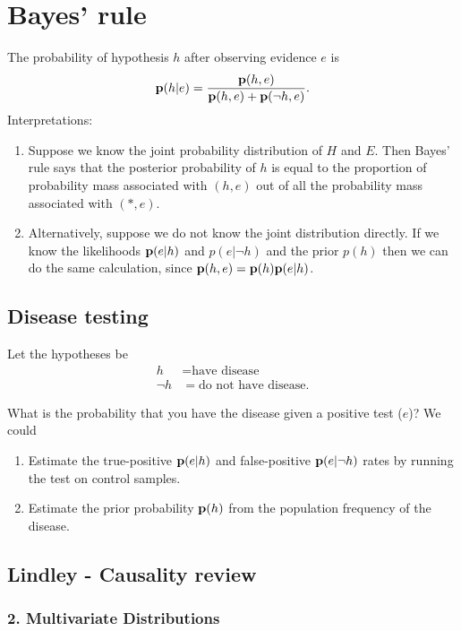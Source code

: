 \section{Bayes' rule}

The probability of hypothesis $h$ after observing evidence $e$ is
\begin{align*}
  \mathbf{p}(h | e)
  = \frac{\mathbf{p}(h, e)}{\mathbf{p}(h, e) + \mathbf{p}(\neg h, e)}.
\end{align*}
Interpretations:
\begin{enumerate}
\item Suppose we know the joint probability distribution of $H$ and $E$. Then Bayes' rule says that the posterior
  probability of $h$ is equal to the proportion of probability mass associated with $(h, e)$ out of all the
  probability mass associated with $(*, e)$.

\item Alternatively, suppose we do not know the joint distribution directly. If we know the likelihoods
  $\mathbf{p}(e|h)$ and $p(e|\neg h)$ and the prior $p(h)$ then we can do the same calculation, since $\mathbf{p}(h, e) = \mathbf{p}(h)\mathbf{p}(e | h)$.
\end{enumerate}

\subsection{Disease testing}

Let the hypotheses be
\begin{align*}
  h      &= \text{have disease} \\
  \neg h &= \text{do not have disease}.
\end{align*}

What is the probability that you have the disease given a positive test ($e$)? We could
\begin{enumerate}
\item Estimate the true-positive $\mathbf{p}(e|h)$ and false-positive $\mathbf{p}(e|\neg h)$ rates by running the test on control samples.
\item Estimate the prior probability $\mathbf{p}(h)$ from the population frequency of the disease.
\end{enumerate}


\subsection{Lindley - Causality review}

\subsubsection{2. Multivariate Distributions}

